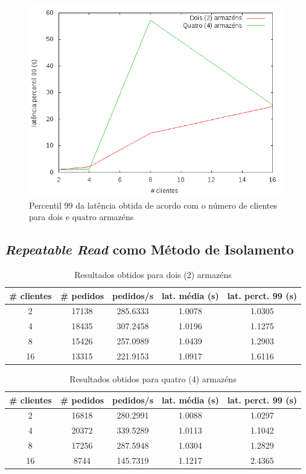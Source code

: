 \begin{figure}[!h]
\centering
\includegraphics[scale=.5]{img/questao-1/ser-lat-pct99}
\caption{Percentil 99 da latência obtida de acordo com o número de clientes para dois e quatro armazéns}
\end{figure}

\subsection{\textit{Repeatable Read} como Método de Isolamento}

\begin{table}[!h]
\center
\small
\begin{tabular}{|c|c|c|c|c|}
\hline
\textbf{\# clientes} & \textbf{\# pedidos} & \textbf{pedidos/s} & \textbf{lat. média (s)} & \textbf{lat. perct. 99 (s)}  \\ \hline
2 & 17138 & 285.6333 & 1.0078 & 1.0305  \\ \hline
4 & 18435 & 307.2458 & 1.0196 & 1.1275  \\ \hline
8 & 15426 & 257.0989 & 1.0439 & 1.2903  \\ \hline
16 & 13315 & 221.9153 & 1.0917 & 1.6116  \\ \hline
\end{tabular}
\caption{Resultados obtidos para dois (2) armazéns}
\end{table}

\begin{table}[!h]
\center
\small
\begin{tabular}{|c|c|c|c|c|}
\hline
\textbf{\# clientes} & \textbf{\# pedidos} & \textbf{pedidos/s} & \textbf{lat. média (s)} & \textbf{lat. perct. 99 (s)}  \\ \hline
2 & 16818 & 280.2991 & 1.0088 & 1.0297  \\ \hline
4 & 20372 & 339.5289 & 1.0113 & 1.1042  \\ \hline
8 & 17256 & 287.5948 & 1.0304 & 1.2829  \\ \hline
16 & 8744 & 145.7319 & 1.1217 & 2.4365  \\ \hline
\end{tabular}
\caption{Resultados obtidos para quatro (4) armazéns}
\end{table}

